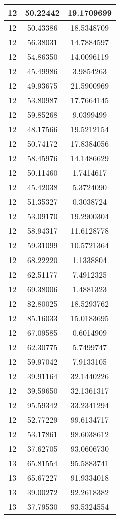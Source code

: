 \documentclass[
]{book}
\begin{document}
\begin{tabular}{c|c|c}
\hline
12 & 50.22442 & 19.1709699\\
\hline
12 & 50.43386 & 18.5348709\\
\hline
12 & 56.38031 & 14.7884597\\
\hline
12 & 54.86350 & 14.0096119\\
\hline
12 & 45.49986 & 3.9854263\\
\hline
12 & 49.93675 & 21.5900969\\
\hline
12 & 53.80987 & 17.7664145\\
\hline
12 & 59.85268 & 9.0399499\\
\hline
12 & 48.17566 & 19.5212154\\
\hline
12 & 50.74172 & 17.8384056\\
\hline
12 & 58.45976 & 14.1486629\\
\hline
12 & 50.11460 & 1.7414617\\
\hline
12 & 45.42038 & 5.3724090\\
\hline
12 & 51.35327 & 0.3038724\\
\hline
12 & 53.09170 & 19.2900304\\
\hline
12 & 58.94317 & 11.6128778\\
\hline
12 & 59.31099 & 10.5721364\\
\hline
12 & 68.22220 & 1.1338804\\
\hline
12 & 62.51177 & 7.4912325\\
\hline
12 & 69.38006 & 1.4881323\\
\hline
12 & 82.80025 & 18.5293762\\
\hline
12 & 85.16033 & 15.0183695\\
\hline
12 & 67.09585 & 0.6014909\\
\hline
12 & 62.30775 & 5.7499747\\
\hline
12 & 59.97042 & 7.9133105\\
\hline
12 & 39.91164 & 32.1440226\\
\hline
12 & 39.59650 & 32.1361317\\
\hline
12 & 95.59342 & 33.2341294\\
\hline
12 & 52.77229 & 99.6134717\\
\hline
12 & 53.17861 & 98.6038612\\
\hline
12 & 37.62705 & 93.0606730\\
\hline
13 & 65.81554 & 95.5883741\\
\hline
13 & 65.67227 & 91.9334018\\
\hline
13 & 39.00272 & 92.2618382\\
\hline
13 & 37.79530 & 93.5324554\\

\end{tabular}
\end{document}
